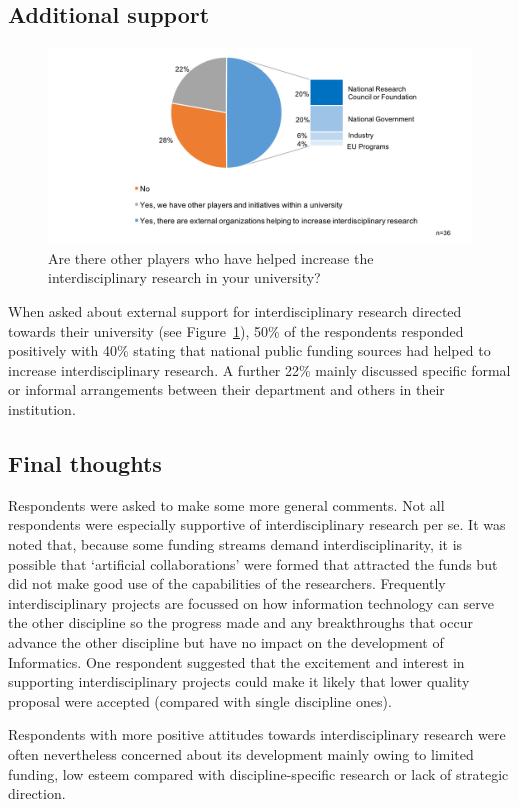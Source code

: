 \subsection {Additional support}

\begin{figure}[h]
\centering
\includegraphics[width = \linewidth]{charts/1d.png}
\caption
{Are there other players who have helped increase the
interdisciplinary research in your university?}
\label{sect1:additional}
\end{figure}

When asked about external support for interdisciplinary research directed towards their university (see Figure~\ref{sect1:additional}), 50\% of the respondents responded positively with 40\% stating that national public funding sources had helped to increase interdisciplinary research. A further 22\% mainly discussed specific formal or informal arrangements between their department and others in their institution.

\subsection{Final thoughts}

Respondents were asked to make some more general comments. Not all respondents were especially supportive of interdisciplinary research per se. It was noted that, because some funding streams demand interdisciplinarity, it is possible that `artificial collaborations' were formed that attracted the funds but did not make good use of the capabilities of the researchers. Frequently interdisciplinary projects are focussed on how information technology can serve the other discipline so the progress made and any breakthroughs that occur advance the other discipline but have no impact on the development of Informatics. One respondent suggested that the excitement and interest in supporting interdisciplinary projects could make it likely that lower quality proposal were accepted (compared with single discipline ones).

Respondents with more positive attitudes towards interdisciplinary research were often nevertheless concerned about its development mainly owing to limited funding, low esteem compared with discipline-specific research or lack of strategic direction.

